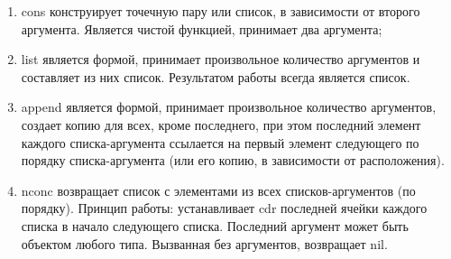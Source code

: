 \documentclass[12pt]{report}
\begin{document}
\begin{enumerate}
	\item cons конструирует точечную пару или список, в зависимости от второго аргумента. Является чистой функцией, принимает два аргумента;
	\item list является формой, принимает произвольное количество аргументов и составляет из них список. Результатом работы всегда является список.
	\item append является формой, принимает произвольное количество аргументов, создает копию для всех, кроме последнего, при этом последний элемент каждого списка-аргумента ссылается на первый элемент следующего по порядку списка-аргумента (или его копию, в зависимости от расположения).
	\item nconc возвращает список с элементами из всех списков-аргументов (по порядку). Принцип работы: устанавливает cdr последней ячейки каждого списка в начало следующего списка. Последний аргумент может быть объектом любого типа. Вызванная без аргументов, возвращает nil.
\end{enumerate} 


	
	
\end{document}

